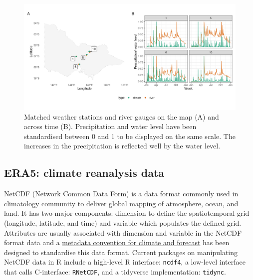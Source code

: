 \documentclass[
]{jss}
\begin{document}
\begin{CodeChunk}
\begin{figure}

{\centering \includegraphics[width=1\linewidth]{figures/matching} 

}

\caption[Matched weather stations and river gauges on the map (A) and across time (B)]{Matched weather stations and river gauges on the map (A) and across time (B). Precipitation and water level have been standardised between 0 and 1 to be displayed on the same scale. The increases in the precipitation is reflected well by the water level.}\label{fig:matching}
\end{figure}
\end{CodeChunk}

\hypertarget{era5-climate-reanalysis-data}{%
\subsection{ERA5: climate reanalysis
data}\label{era5-climate-reanalysis-data}}

NetCDF (Network Common Data Form) is a data format commonly used in
climatology community to deliver global mapping of atmosphere, ocean,
and land. It has two major components: dimension to define the
spatiotemporal grid (longitude, latitude, and time) and variable which
populates the defined grid. Attributes are usually associated with
dimension and variable in the NetCDF format data and a
\href{http://cfconventions.org/}{metadata convention for climate and
forecast} has been designed to standardise this data format. Current
packages on manipulating NetCDF data in R include a high-level R
interface: \texttt{ncdf4}\citep{ncdf4}, a low-level interface that calls
C-interface: \texttt{RNetCDF}\citep{rnetcdf, michna2013rnetcdf}, and a
tidyverse implementation: \texttt{tidync}\citep{tidync}.
\end{document}
